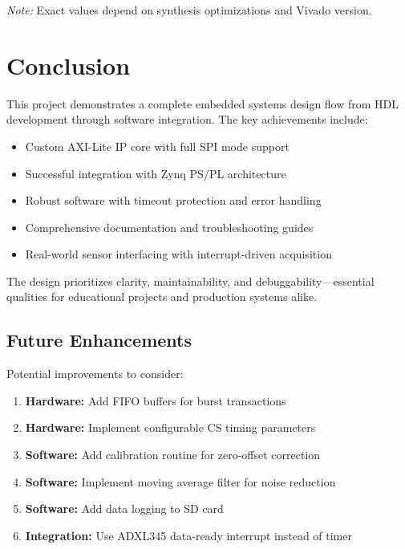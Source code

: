 \documentclass[11pt,a4paper]{article}
\begin{document}
\textit{Note:} Exact values depend on synthesis optimizations and Vivado version.

\section{Conclusion}

This project demonstrates a complete embedded systems design flow from HDL development through software integration. The key achievements include:

\begin{itemize}
    \item Custom AXI-Lite IP core with full SPI mode support
    \item Successful integration with Zynq PS/PL architecture
    \item Robust software with timeout protection and error handling
    \item Comprehensive documentation and troubleshooting guides
    \item Real-world sensor interfacing with interrupt-driven acquisition
\end{itemize}

The design prioritizes clarity, maintainability, and debuggability—essential qualities for educational projects and production systems alike.

\subsection{Future Enhancements}

Potential improvements to consider:

\begin{enumerate}
    \item \textbf{Hardware:} Add FIFO buffers for burst transactions
    \item \textbf{Hardware:} Implement configurable CS timing parameters
    \item \textbf{Software:} Add calibration routine for zero-offset correction
    \item \textbf{Software:} Implement moving average filter for noise reduction
    \item \textbf{Software:} Add data logging to SD card
    \item \textbf{Integration:} Use ADXL345 data-ready interrupt instead of timer
\end{enumerate}
\end{document}
